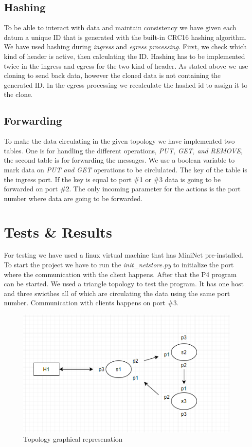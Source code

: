 \documentclass[sigconf,natbib=false]{acmart}
\begin{document}
\subsection{Hashing}
To be able to interact with data and maintain consistency we have given each datum a unique ID that is generated with the built-in CRC16 hashing \cite{hashing2} algorithm. We have used hashing during \textit{ingress} and \textit{egress processing}. First, we check which kind of header is active, then calculating the ID. Hashing has to be implemented twice in the ingress and egress for the two kind of header. As stated above we use cloning to send back data, however the cloned data is not containing the generated ID. In the egress processing we recalculate the hashed id to assign it to the clone.
\cite{scholz2019cryptographic}
\subsection{Forwarding}
To make the data circulating in the given topology we have implemented two tables. One is for handling the different operations, \textit{PUT, GET, and REMOVE}, the second table is for forwarding the messages. We use a boolean variable to mark data on \textit{PUT and GET} operations to be circlulated. The key of the table is the ingress port. If the key is equal to port \#1 or \#3 data is going to be forwarded on port \#2. The only incoming parameter for the actions is the port number where data are going to be forwarded.

\section{Tests \& Results}
For testing we have used a linux virtual machine that has MiniNet pre-installed. To start the project we have to run the \textit{init\_netstore.py} to initialize the port where the communication with the client happens. After that the P4 program can be started. We used a triangle topology to test the program. It has one host and three swicthes all of which are circulating the data using the same port number. Communication with clients happens on port \#3.
\begin{figure}[ht]
	\caption{Topology graphical represenation}
	\includegraphics[scale=0.7]{top.png}
	\centering
\end{figure}
\end{document}
